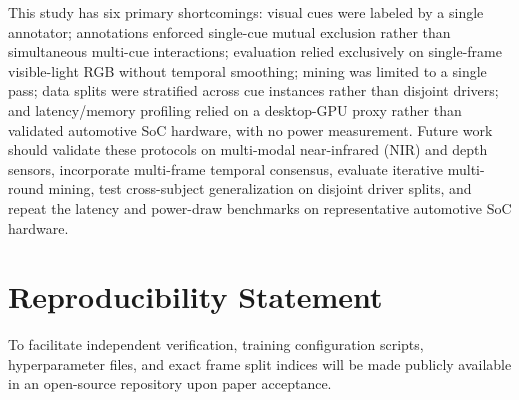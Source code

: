 \documentclass[conference]{IEEEtran}
\begin{document}
This study has six primary shortcomings: visual cues were labeled by a single annotator; annotations enforced single-cue mutual exclusion rather than simultaneous multi-cue interactions; evaluation relied exclusively on single-frame visible-light RGB without temporal smoothing; mining was limited to a single pass; data splits were stratified across cue instances rather than disjoint drivers; and latency/memory profiling relied on a desktop-GPU proxy rather than validated automotive SoC hardware, with no power measurement. Future work should validate these protocols on multi-modal near-infrared (NIR) and depth sensors, incorporate multi-frame temporal consensus, evaluate iterative multi-round mining, test cross-subject generalization on disjoint driver splits, and repeat the latency and power-draw benchmarks on representative automotive SoC hardware.
\section*{Reproducibility Statement}
To facilitate independent verification, training configuration scripts, hyperparameter files, and exact frame split indices will be made publicly available in an open-source repository upon paper acceptance.
 
\end{document}

